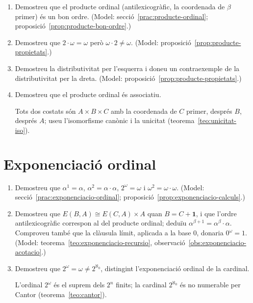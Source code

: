 \begin{enumerate}[resume]
  \item Demostreu que el producte ordinal (antilexicogràfic, la coordenada de \(\beta\) primer) és un bon ordre. (Model: secció~\ref{prac:producte-ordinal}; proposició~\ref{prop:producte-bon-ordre}.)

  \item Demostreu que \(2\cdot\omega=\omega\) però \(\omega\cdot2\neq\omega\). (Model: proposició~\ref{prop:producte-propietats}.)

  \item Demostreu la distributivitat per l'esquerra i doneu un contraexemple de la distributivitat per la dreta. (Model: proposició~\ref{prop:producte-propietats}.)

  \item Demostreu que el producte ordinal és associatiu. \begin{indicacio}Tots dos costats són \(A\times B\times C\) amb la coordenada de \(C\) primer, després \(B\), després \(A\); useu l'isomorfisme canònic i la unicitat (teorema~\ref{teo:unicitat-iso}).\end{indicacio}
\end{enumerate}

\section{Exponenciació ordinal}

\begin{enumerate}[resume]
  \item Demostreu que \(\alpha^1=\alpha\), \(\alpha^2=\alpha\cdot\alpha\), \(2^\omega=\omega\) i \(\omega^2=\omega\cdot\omega\). (Model: secció~\ref{prac:exponenciacio-ordinal}; proposició~\ref{prop:exponenciacio-calculs}.)

  \item Demostreu que \(E(B,A)\cong E(C,A)\times A\) quan \(B=C+\mathbf1\), i que l'ordre antilexicogràfic correspon al del producte ordinal; deduïu \(\alpha^{\beta+1}=\alpha^\beta\cdot\alpha\). Comproveu també que la clàusula límit, aplicada a la base \(0\), donaria \(0^\omega=1\). (Model: teorema~\ref{teo:exponenciacio-recursio}, observació~\ref{obs:exponenciacio-acotacio}.)

  \item Demostreu que \(2^\omega=\omega\neq2^{\aleph_0}\), distingint l'exponenciació ordinal de la cardinal. \begin{indicacio}L'ordinal \(2^\omega\) és el suprem dels \(2^n\) finits; la cardinal \(2^{\aleph_0}\) és no numerable per Cantor (teorema~\ref{teo:cantor}).\end{indicacio}
\end{enumerate}

